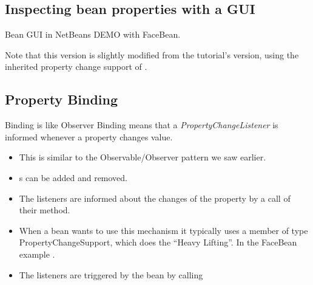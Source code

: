 \subsection{Inspecting bean properties with a GUI}
\begin{frame}{Bean GUI in NetBeans}
  DEMO with FaceBean.

  Note that this version is slightly modified from the tutorial's
  version, using the inherited property change support of .
\end{frame}

\subsection[binding]{Property Binding}
\begin{frame}{Binding is like Observer}
  Binding means that a \textit{PropertyChangeListener} is informed
  whenever a property changes value.
  \begin{itemize}
  \item This is similar to the Observable/Observer pattern we saw
    earlier.

  \item {}s can be added and removed.
  \item The listeners are informed about the changes of the property by
    a call of their
     method.

  \item When a bean wants to use this mechanism it typically uses a
    member of type PropertyChangeSupport, which  does the
    \enquote{Heavy Lifting}. In the FaceBean example .
 
  \item The listeners are triggered by the bean by calling 
  \end{itemize}

\end{frame}

